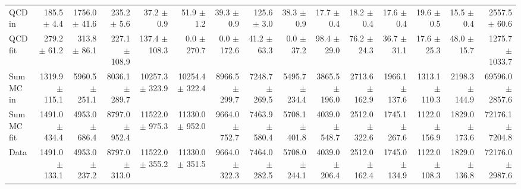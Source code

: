 \begin{table}[htbp]
{\begin{tabular}{lrrrrrrrrrrrrrr}
\hline
QCD in & 185.5 $\pm$ 4.4 & 1756.0 $\pm$ 41.6 & 235.2 $\pm$ 5.6 & 37.2 $\pm$ 0.9 & 51.9 $\pm$ 1.2 & 39.3 $\pm$ 0.9 & 125.6 $\pm$ 3.0 & 38.3 $\pm$ 0.9 & 17.7 $\pm$ 0.4 & 18.2 $\pm$ 0.4 & 17.6 $\pm$ 0.4 & 19.6 $\pm$ 0.5 & 15.5 $\pm$ 0.4 & 2557.5 $\pm$ 60.6 \\
QCD fit & 279.2 $\pm$ 61.2 & 313.8 $\pm$ 86.1 & 227.1 $\pm$ 108.9 & 137.4 $\pm$ 108.3 & 0.0 $\pm$ 270.7 & 0.0 $\pm$ 172.6 & 41.2 $\pm$ 63.3 & 0.0 $\pm$ 37.2 & 98.4 $\pm$ 29.0 & 76.2 $\pm$ 24.3 & 36.7 $\pm$ 31.1 & 17.6 $\pm$ 25.3 & 48.0 $\pm$ 15.7 & 1275.7 $\pm$ 1033.7 \\
\hline
Sum MC in & 1319.9 $\pm$ 115.1 & 5960.5 $\pm$ 251.1 & 8036.1 $\pm$ 289.7 & 10257.3 $\pm$ 323.9 & 10254.4 $\pm$ 322.4 & 8966.5 $\pm$ 299.7 & 7248.7 $\pm$ 269.5 & 5495.7 $\pm$ 234.4 & 3865.5 $\pm$ 196.0 & 2713.6 $\pm$ 162.9 & 1966.1 $\pm$ 137.6 & 1313.1 $\pm$ 110.3 & 2198.3 $\pm$ 144.9& 69596.0 $\pm$ 2857.6 \\
Sum MC fit & 1491.0 $\pm$ 434.4 & 4953.0 $\pm$ 686.4 & 8797.0 $\pm$ 952.4 & 11522.0 $\pm$ 975.3 & 11330.0 $\pm$ 952.0 & 9664.0 $\pm$ 752.7 & 7463.9 $\pm$ 580.4 & 5708.1 $\pm$ 401.8 & 4039.0 $\pm$ 548.7 & 2512.0 $\pm$ 322.6 & 1745.1 $\pm$ 267.6 & 1122.0 $\pm$ 156.9 & 1829.0 $\pm$ 173.6 & 72176.1 $\pm$ 7204.8 \\
\hline
Data & 1491.0 $\pm$ 133.1 & 4953.0 $\pm$ 237.2 & 8797.0 $\pm$ 313.0 & 11522.0 $\pm$ 355.2 & 11330.0 $\pm$ 351.5 & 9664.0 $\pm$ 322.3 & 7464.0 $\pm$ 282.5 & 5708.0 $\pm$ 244.1 & 4039.0 $\pm$ 206.4 & 2512.0 $\pm$ 162.4 & 1745.0 $\pm$ 134.9 & 1122.0 $\pm$ 108.3 & 1829.0 $\pm$ 136.8 & 72176.0 $\pm$ 2987.6 \\
\hline
\end{tabular}
}
\end{table}

